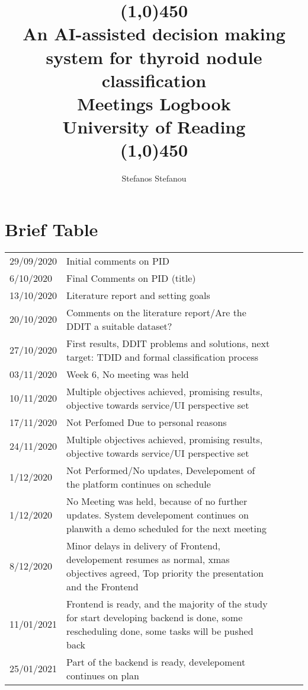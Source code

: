 \documentclass[openany]{article}
\title{\line(1,0){450}\\An AI-assisted decision making system for thyroid nodule classification \\ Meetings Logbook \\ \footnotesize University of Reading  \\\line(1,0){450}}
\author{Stefanos Stefanou}
\begin{document}
	\maketitle
	\section{Brief Table}
		\begin{table}[H]
			\begin{tabular}{lllll}
				29/09/2020 & Initial comments on PID &  &  &  \\
				6/10/2020  & Final Comments on PID (title)&  &  &  \\
				13/10/2020 & Literature report and setting goals&  &  &  \\
				20/10/2020 & Comments on the literature report/Are the DDIT a suitable dataset?&  &  &  \\
				27/10/2020 & First results, DDIT problems and solutions, next target: TDID and formal classification process&  &  &  \\
				03/11/2020 & Week 6, No meeting was held&  &  &  \\
				10/11/2020 & Multiple objectives achieved, promising results, objective towards service/UI perspective set&  &  &  \\
				17/11/2020 & Not Perfomed Due to personal reasons&  &  &  \\
				24/11/2020 & Multiple objectives achieved, promising results, objective towards service/UI perspective set&  &  &  \\				
				1/12/2020  & Not Performed/No updates, Develepoment of the platform continues on schedule&  &  &  \\				
				1/12/2020  & No Meeting was held, because of no further updates. System develepoment continues on planwith a demo scheduled for the next meeting&  &  &  \\				
				8/12/2020  & Minor delays in delivery of Frontend, developement resumes as normal, xmas objectives agreed, Top priority the presentation and the Frontend&  &  &  \\				
				11/01/2021 & Frontend is ready, and the majority of the study for start developing backend is done, some rescheduling done, some tasks will be pushed back	&  &  &  \\				
				25/01/2021 & Part of the backend is ready, develepoment continues on plan	&  &  &  \\				
			
		\end{tabular}
		\end{table}
\end{document}
